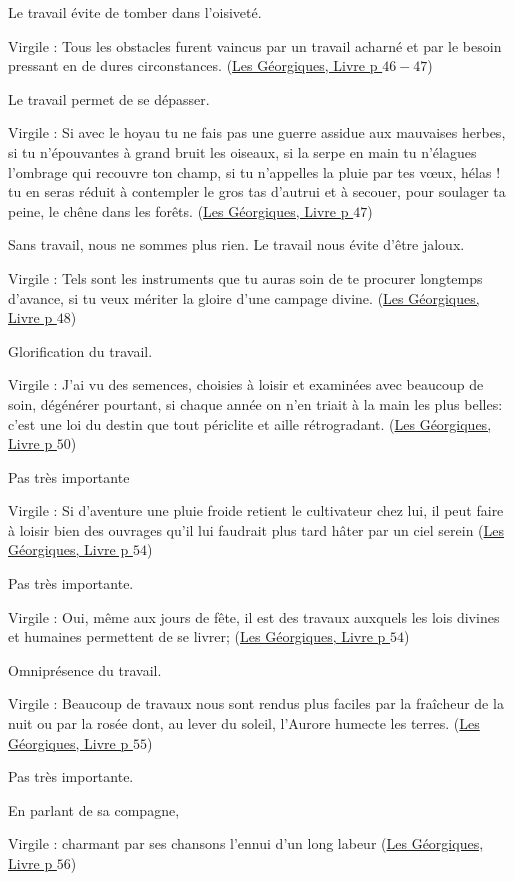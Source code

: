 \documentclass[a4paper, 11pt, hidelinks]{article}
\newcommand{\bs}{\bigskip}
\newcommand{\rb}[1]{\Romanbar{#1}}
\newcommand{\citer}[3]{\bs \begin{center} \textcolor{authorGray}{#1 :} \textcolor{citationRed}{\og #2 \fg} \textcolor{authorGray}{(\underline{#3})} \end{center} \bs}
\begin{document}
Le travail évite de tomber dans l'oisiveté.


\citer{Virgile}{Tous les obstacles furent vaincus par un travail acharné et par le besoin pressant en de dures circonstances.}{Les Géorgiques, Livre \rb{1} p $46-47$}


Le travail permet de se dépasser.


\citer{Virgile}{Si avec le hoyau tu ne fais pas une guerre assidue aux mauvaises herbes, si tu n'épouvantes à grand bruit
les oiseaux, si la serpe en main tu n'élagues l'ombrage qui recouvre ton champ, si tu n'appelles la pluie par tes v\oe ux, hélas ! 
tu en seras réduit à contempler le gros tas d'autrui et à secouer, pour soulager ta peine, le chêne dans les forêts.}{Les Géorgiques, Livre \rb{1} p $47$}


Sans travail, nous ne sommes plus rien. Le travail nous évite d'être jaloux.


\citer{Virgile}{Tels sont les instruments que tu auras soin de te procurer longtemps d'avance, si tu veux mériter la gloire 
d'une campage divine.}{Les Géorgiques, Livre \rb{1} p $48$}


Glorification du travail.


\citer{Virgile}{J'ai vu des semences, choisies à loisir et examinées avec beaucoup de soin, dégénérer pourtant, si chaque année 
on n'en triait à la main les plus belles: c'est une loi du destin que tout périclite et aille rétrogradant.}{Les Géorgiques, Livre \rb{1} p $50$}


Pas très importante


\citer{Virgile}{Si d'aventure une pluie froide retient le cultivateur chez lui, il peut faire à loisir bien des ouvrages qu'il lui 
faudrait plus tard hâter par un ciel serein}{Les Géorgiques, Livre \rb{1} p $54$}


Pas très importante.


\citer{Virgile}{Oui, même aux jours de fête, il est des travaux auxquels les lois divines et humaines permettent de se livrer;}{Les Géorgiques, Livre \rb{1} p $54$}


Omniprésence du travail.


\citer{Virgile}{Beaucoup de travaux nous sont rendus plus faciles par la fraîcheur de la nuit ou par la rosée dont, au lever 
du soleil, l'Aurore humecte les terres.}{Les Géorgiques, Livre \rb{1} p $55$}


Pas très importante.


En parlant de sa compagne, \citer{Virgile}{charmant par ses chansons l'ennui d'un long labeur}{Les Géorgiques, Livre \rb{1} p $56$}
\end{document}
